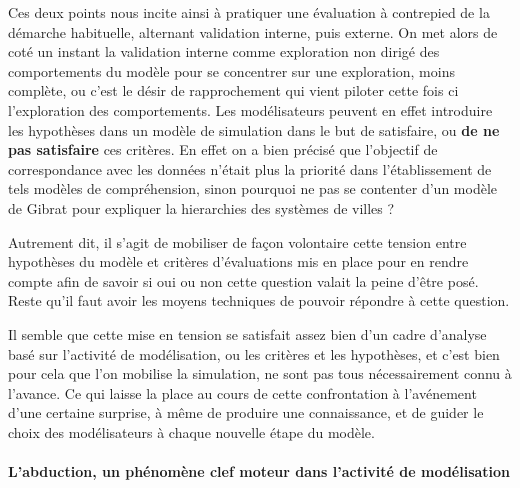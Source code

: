 Ces deux points nous incite ainsi à pratiquer une évaluation à contrepied de la démarche habituelle, alternant validation interne, puis externe. On met alors de coté un instant la validation interne comme exploration non dirigé des comportements du modèle pour se concentrer sur une exploration, moins complète, ou c'est le désir de rapprochement qui vient piloter cette fois ci l'exploration des comportements. Les modélisateurs peuvent en effet introduire les hypothèses dans un modèle de simulation dans le but de satisfaire, ou \textbf{de ne pas satisfaire} ces critères. En effet on a bien précisé que l'objectif de correspondance avec les données n'était plus la priorité dans l'établissement de tels modèles de compréhension, sinon pourquoi ne pas se contenter d'un modèle de Gibrat pour expliquer la hierarchies des systèmes de villes ? 

Autrement dit, il s'agit de mobiliser de façon volontaire cette tension entre hypothèses du modèle et critères d'évaluations mis en place pour en rendre compte afin de savoir si oui ou non cette question valait la peine d'être posé. Reste qu'il faut avoir les moyens techniques de pouvoir répondre à cette question. %

Il semble que cette mise en tension se satisfait assez bien d'un cadre d'analyse basé sur l'activité de modélisation, ou les critères et les hypothèses, et c'est bien pour cela que l'on mobilise la simulation, ne sont pas tous nécessairement connu à l'avance. Ce qui laisse la place au cours de cette confrontation à l'avénement d'une certaine surprise, à même de produire une connaissance, et de guider le choix des modélisateurs à chaque nouvelle étape du modèle. 




\paragraph{L'abduction, un phénomène clef moteur dans l'activité de modélisation}

